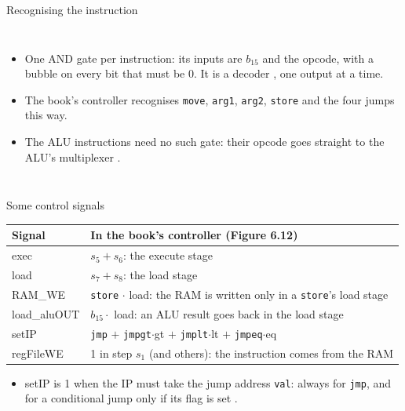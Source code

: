 \documentclass[10pt]{wosm-slides}
\begin{document}
\begin{frame}{Recognising the instruction}
  \begin{columns}[c, totalwidth=\textwidth]
      \centering
      \par\smallskip
      \begin{itemize}
        \item One AND gate per instruction: its inputs are $b_{15}$ and the opcode,
          with a bubble on every bit that must be 0. It is a decoder ,
          one output at a time.
        \item The book's controller recognises \texttt{move}, \texttt{arg1},
          \texttt{arg2}, \texttt{store} and the four jumps this way.
        \item The ALU instructions need no such gate: their opcode goes straight to
          the ALU's multiplexer .
      \end{itemize}
  \end{columns}
\end{frame}

\begin{frame}{Some control signals}
  \begin{center}
    \begin{tabular}{@{}ll@{}}
      \toprule
      Signal & In the book's controller (Figure 6.12) \\
      \midrule
      exec & $s_5 + s_6$: the execute stage \\
      load & $s_7 + s_8$: the load stage \\
      RAM\_WE & \texttt{store} $\cdot$ load: the RAM is written only in a
        \texttt{store}'s load stage \\
      load\_aluOUT & $b_{15} \cdot$ load: an ALU result goes back in the load stage \\
      setIP & \texttt{jmp} $+$ \texttt{jmpgt}$\cdot$gt $+$ \texttt{jmplt}$\cdot$lt
        $+$ \texttt{jmpeq}$\cdot$eq \\
      regFileWE & 1 in step $s_1$ (and others): the instruction comes from the RAM \\
      \bottomrule
    \end{tabular}
  \end{center}

  \begin{itemize}
    \item setIP is 1 when the IP must take the jump address \texttt{val}: always for
      \texttt{jmp}, and for a conditional jump only if its flag is set .
  \end{itemize}
\end{frame}
\end{document}

